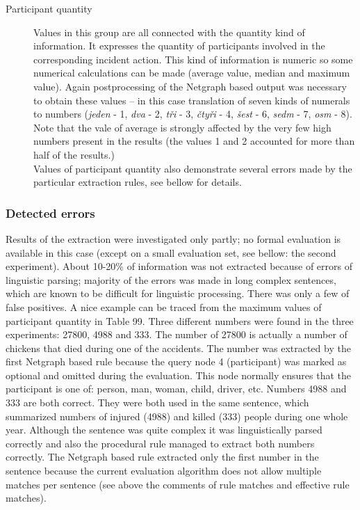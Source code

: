 \begin{description}
	\item[Participant quantity]
Values in this group are all connected with the quantity kind of information. It expresses the quantity of participants involved in the corresponding incident action. This kind of information is numeric so some numerical calculations can be made (average value, median and maximum value). Again postprocessing of the Netgraph based output was necessary to obtain these values -- in this case translation of seven kinds of numerals to numbers (\emph{jeden} - 1, \emph{dva} - 2, \emph{tři} - 3, \emph{čtyři} - 4, \emph{šest} - 6, \emph{sedm} - 7, \emph{osm} - 8). Note that the vale of average is strongly affected by the very few high numbers present in the results (the values 1 and 2 accounted for more than half of the results.)\\
Values of participant quantity also demonstrate several errors made by the particular extraction rules, see bellow for details.
\end{description}





















\subsubsection{Detected errors}

Results of the extraction were investigated only partly; no formal evaluation is available in this case (except on a small evaluation set, see bellow: the second experiment). About 10-20\% of information was not extracted because of errors of linguistic parsing; majority of the errors was made in long complex sentences, which are known to be difficult for linguistic processing. There was only a few of false positives. A nice example can be traced from the maximum values of participant quantity in Table 99. Three different numbers were found in the three experiments: 27800, 4988 and 333. The number of 27800 is actually a number of chickens that died during one of the accidents. The number was extracted by the first Netgraph based rule because the query node 4 (participant) was marked as optional and omitted during the evaluation. This node normally ensures that the participant is one of: person, man, woman, child, driver, etc.
Numbers 4988 and 333 are both correct. They were both used in the same sentence, which summarized numbers of injured (4988) and killed (333) people during one whole year. Although the sentence was quite complex it was linguistically parsed correctly and also the procedural rule managed to extract both numbers correctly. The Netgraph based rule extracted only the first number in the sentence because the current evaluation algorithm does not allow multiple matches per sentence (see above the comments of rule matches and effective rule matches).


